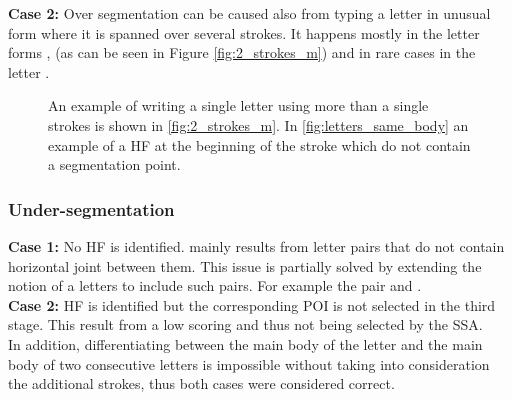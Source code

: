 \documentclass[journal,compsoc]{IEEEtran}
\begin{document}
\textbf{Case 2:} Over segmentation can be caused also from typing a letter in unusual form where it is spanned over several strokes. It happens mostly in the letter forms ,  (as can be seen in Figure \ref{fig:2_strokes_m}) and in rare cases in the letter .

\begin{figure}
\centering
        \qquad
        \qquad
    \caption{An example of writing a single letter using more than a single strokes is shown in \ref{fig:2_strokes_m}. In \ref{fig:letters_same_body} an example of a HF at the beginning of the stroke which do not contain a segmentation point.}
   \label{fig:over_segmentations}
\end{figure}

\subsubsection{Under-segmentation}
\textbf{Case 1:} No HF is identified. mainly results from letter pairs that do not contain horizontal joint between them. This issue is partially solved by extending the notion of a letters to include such pairs. For example the pair  and .\\

\textbf{Case 2:} HF is identified but the corresponding POI is not selected in the third stage. This result from a low scoring and thus not being selected by the SSA.\\

In addition, differentiating between the main body of the letter  and the main body of two consecutive  letters is impossible without taking into consideration the additional strokes, thus both cases were considered correct.\\
\end{document}
